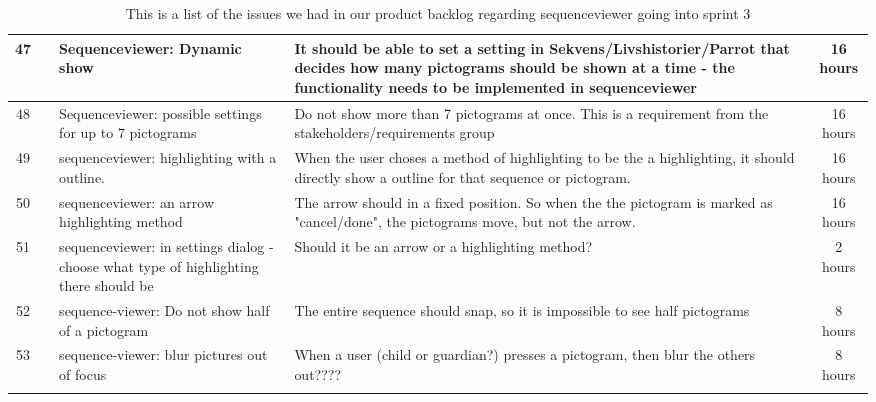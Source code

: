 \begin{longtable} { | c | c | p{5cm} | p{5cm} | c | } 
\hline
	47	&		 &	Sequenceviewer: Dynamic show	 &		It should be able to set a setting in Sekvens/Livshistorier/Parrot that decides how many pictograms should be shown at a time - the functionality needs to be implemented in sequenceviewer	 &	16 hours \\\hline
	48	&		 &	Sequenceviewer: possible settings for up to 7 pictograms		 &		Do not show more than 7 pictograms at once. This is a requirement from the stakeholders/requirements group			 & 	16 hours	\\\hline
	49	&		 &	sequenceviewer: highlighting with a outline.	 &	When the user choses a method of highlighting to be the a highlighting, it should directly show a outline for that sequence or pictogram.			 &	16 hours \\\hline
	50	&		 &	sequenceviewer: an arrow highlighting method	 &	The arrow should in a fixed position. So when the the pictogram is marked as "cancel/done", the pictograms move, but not the arrow.				 &	16 hours \\\hline
	51	&		 &	sequenceviewer: in settings dialog - choose what type of highlighting there should be		 &	Should it be an arrow or a highlighting method?	 &	2 hours \\\hline
	52	&		 &	sequence-viewer: Do not show half of a pictogram		 & 	The entire sequence should snap, so it is impossible to see half pictograms	 &	8 hours	\\\hline
	53	&		 &	sequence-viewer: blur pictures out of focus		 &	When a user (child or guardian?) presses a pictogram, then blur the others out????			 &	8 hours \\\hline
\caption{This is a list of the issues we had in our product backlog regarding sequenceviewer going into sprint 3}
\label{tab:spr3_sw_prodblog}
\end{longtable}

